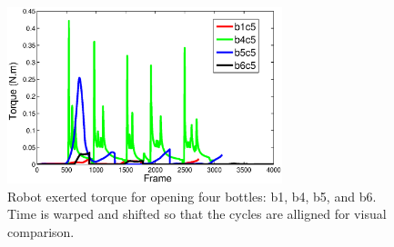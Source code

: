 \begin{figure}
  \centering
  \includegraphics[width=8cm]{./fig/rb1b4b5b6_time_T.eps}
  \caption{ \scriptsize{Robot exerted torque for opening four bottles:
      b1, b4, b5, and b6. Time is warped and shifted so that the
      cycles are alligned for visual comparison.}
}
\label{fig:demo_b1b4b5b6}
\end{figure}




%
%
